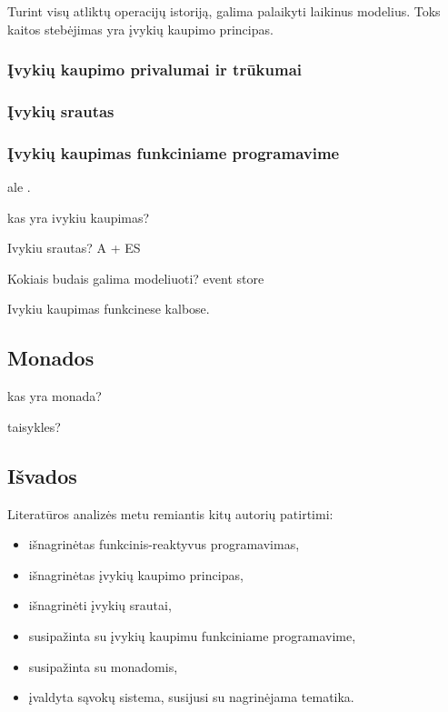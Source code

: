 Turint visų atliktų operacijų istoriją, galima palaikyti laikinus modelius. Toks kaitos stebėjimas yra įvykių kaupimo principas. 

\subsubsection{Įvykių kaupimo privalumai ir trūkumai}

\subsubsection{Įvykių srautas}

\subsubsection{Įvykių kaupimas funkciniame programavime}

ale \cite{vernon2013implementing}.

kas yra ivykiu kaupimas?

Ivykiu srautas? A + ES

Kokiais budais galima modeliuoti? event store

Ivykiu kaupimas funkcinese kalbose.

\subsection{Monados}

kas yra monada?

taisykles?

\subsection{Išvados}

Literatūros analizės metu remiantis kitų autorių patirtimi:

\begin{itemize}

\item išnagrinėtas funkcinis-reaktyvus programavimas,

\item išnagrinėtas įvykių kaupimo principas,

\item išnagrinėti įvykių srautai,

\item susipažinta su įvykių kaupimu funkciniame programavime,

\item susipažinta su monadomis,

\item įvaldyta sąvokų sistema, susijusi su nagrinėjama tematika.

\end{itemize}
